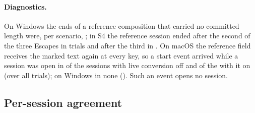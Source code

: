 \paragraph{Diagnostics.} On Windows the ends of a reference composition that carried no committed length were, per
scenario, ; in S4 the reference session ended after the second of the three
Escapes in  trials and after the third in . On
macOS the reference field receives the marked text again at every key, so a start event arrived while a session was open
in  of the 
sessions with live conversion off and  of the
 with it on (over all trials); on Windows in none
(). Such an event opens no session.




\subsection{Per-session agreement}
\label{sec:results-session}


